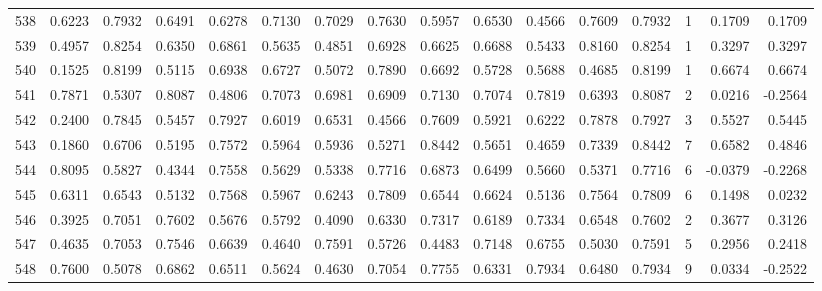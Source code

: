 \begin{tabular}{lrrrrrrrrrrrrrrr}
538 &      0.6223 &  0.7932 &  0.6491 &  0.6278 &  0.7130 &  0.7029 &  0.7630 &  0.5957 &  0.6530 &  0.4566 &   0.7609 &     0.7932 &      1 &                    0.1709 &                     0.1709 \\
539 &      0.4957 &  0.8254 &  0.6350 &  0.6861 &  0.5635 &  0.4851 &  0.6928 &  0.6625 &  0.6688 &  0.5433 &   0.8160 &     0.8254 &      1 &                    0.3297 &                     0.3297 \\
540 &      0.1525 &  0.8199 &  0.5115 &  0.6938 &  0.6727 &  0.5072 &  0.7890 &  0.6692 &  0.5728 &  0.5688 &   0.4685 &     0.8199 &      1 &                    0.6674 &                     0.6674 \\
541 &      0.7871 &  0.5307 &  0.8087 &  0.4806 &  0.7073 &  0.6981 &  0.6909 &  0.7130 &  0.7074 &  0.7819 &   0.6393 &     0.8087 &      2 &                    0.0216 &                    -0.2564 \\
542 &      0.2400 &  0.7845 &  0.5457 &  0.7927 &  0.6019 &  0.6531 &  0.4566 &  0.7609 &  0.5921 &  0.6222 &   0.7878 &     0.7927 &      3 &                    0.5527 &                     0.5445 \\
543 &      0.1860 &  0.6706 &  0.5195 &  0.7572 &  0.5964 &  0.5936 &  0.5271 &  0.8442 &  0.5651 &  0.4659 &   0.7339 &     0.8442 &      7 &                    0.6582 &                     0.4846 \\
544 &      0.8095 &  0.5827 &  0.4344 &  0.7558 &  0.5629 &  0.5338 &  0.7716 &  0.6873 &  0.6499 &  0.5660 &   0.5371 &     0.7716 &      6 &                   -0.0379 &                    -0.2268 \\
545 &      0.6311 &  0.6543 &  0.5132 &  0.7568 &  0.5967 &  0.6243 &  0.7809 &  0.6544 &  0.6624 &  0.5136 &   0.7564 &     0.7809 &      6 &                    0.1498 &                     0.0232 \\
546 &      0.3925 &  0.7051 &  0.7602 &  0.5676 &  0.5792 &  0.4090 &  0.6330 &  0.7317 &  0.6189 &  0.7334 &   0.6548 &     0.7602 &      2 &                    0.3677 &                     0.3126 \\
547 &      0.4635 &  0.7053 &  0.7546 &  0.6639 &  0.4640 &  0.7591 &  0.5726 &  0.4483 &  0.7148 &  0.6755 &   0.5030 &     0.7591 &      5 &                    0.2956 &                     0.2418 \\
548 &      0.7600 &  0.5078 &  0.6862 &  0.6511 &  0.5624 &  0.4630 &  0.7054 &  0.7755 &  0.6331 &  0.7934 &   0.6480 &     0.7934 &      9 &                    0.0334 &                    -0.2522 \\

\end{tabular}

